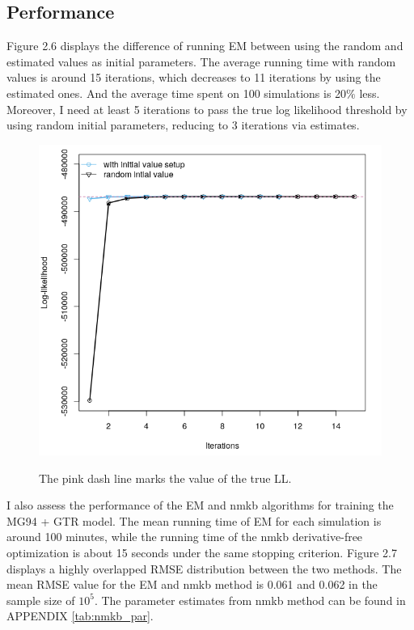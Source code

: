 \subsection{Performance}
Figure 2.6 displays the difference of running EM between using the random and estimated values as initial parameters. The average running time with random values is around 15 iterations, which decreases to 11 iterations by using the estimated ones. And the average time spent on 100 simulations is 20$\%$ less. Moreover, I need at least 5 iterations to pass the true log likelihood threshold by using random initial parameters, reducing to 3 iterations via estimates.  

\begin{figure}[H]
     \begin{minipage}[t]{1\textwidth }
     \centering
     \includegraphics[width=\linewidth]{Fig6.png}
     {{The pink dash line marks the value of the true LL. }
     \par}
     \end{minipage}
\end{figure}
   
I also assess the performance of the EM and nmkb algorithms for training the MG94 + GTR model. The mean running time of EM for each simulation is around 100 minutes, while the running time of the nmkb derivative-free optimization is about 15 seconds under the same stopping criterion. Figure 2.7 displays a highly overlapped RMSE distribution between the two methods. The mean RMSE value for the EM and nmkb method is 0.061 and 0.062 in the sample size of $10^5$. The parameter estimates from nmkb method can be found in APPENDIX \ref{tab:nmkb_par}. 

